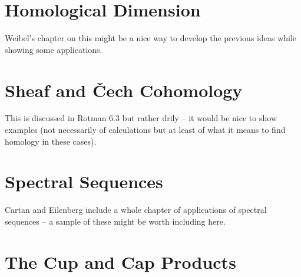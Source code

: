 \documentclass[oneside,english]{amsbook}
\numberwithin{section}{chapter}
\theoremstyle{plain}
\theoremstyle{definition}
\providecommand{\Cech}{\v{C}ech }
\begin{document}
	\chapter{Homological Dimension}
	
	Weibel's chapter on this might be a nice way to develop the previous ideas while showing some applications.
	
	\chapter{Sheaf and \Cech Cohomology}
	
	This is discussed in Rotman 6.3 but rather drily -- it would be nice to show examples (not necessarily of calculations but at least of what it means to find homology in these cases).

	\chapter{Spectral Sequences}
	
	Cartan and Eilenberg include a whole chapter of applications of spectral sequences -- a sample of these might be worth including here.

	\chapter{The Cup and Cap Products}
\end{document}
